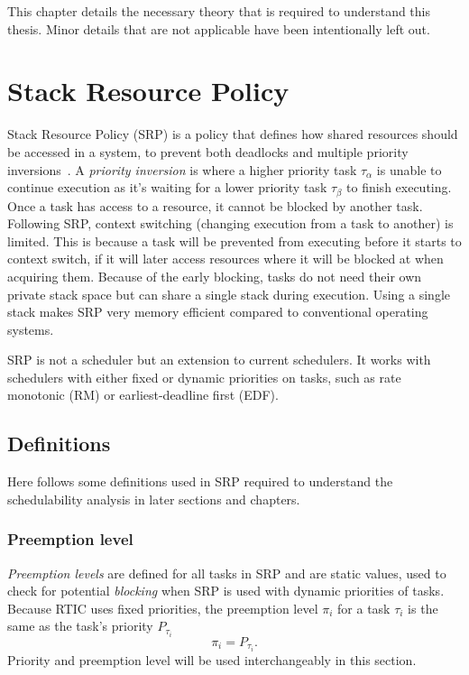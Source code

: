 This chapter details the necessary theory that is required to understand this thesis.
Minor details that are not applicable have been intentionally left out.

\section{Stack Resource Policy}\label{theory:srp}
Stack Resource Policy (SRP) is a policy that defines how shared resources
should be accessed in a system, to prevent both deadlocks and multiple priority
inversions~\cite{srp}. A \emph{priority inversion} is where a higher priority
task $\tau_\alpha$ is unable to continue execution as it's waiting for a lower
priority task $\tau_\beta$ to finish executing. Once a task has access to a
resource, it cannot be blocked by another task. Following SRP, context
switching (changing execution from a task to another) is limited. This is
because a task will be prevented from executing before it starts to context
switch, if it will later access resources where it will be blocked at when
acquiring them. Because of the early blocking, tasks do not need their own
private stack space but can share a single stack during execution. Using a
single stack makes SRP very memory efficient compared to conventional operating
systems\cite{hardrealtimecomputingsystems}.

SRP is not a scheduler but an extension to current schedulers. It works with
schedulers with either fixed or dynamic priorities on tasks, such as rate
monotonic (RM) or earliest-deadline first (EDF).

\subsection{Definitions}\label{theory:srp:definitions}
Here follows some definitions used in SRP required to understand the
schedulability analysis in later sections and chapters.

\subsubsection{Preemption level}\label{theory:srp:definitions:preemption}
\emph{Preemption levels} are defined for all tasks in SRP and are static
values, used to check for potential \emph{blocking} when SRP is used with
dynamic priorities of tasks. Because RTIC uses fixed priorities, the
preemption level $\pi_i$ for a task $\tau_i$ is the same as the task's priority
$P_{\tau_i}$
\begin{equation}
    \pi_i = P_{\tau_i}.
\end{equation}
Priority and preemption level will be used interchangeably in this section.

